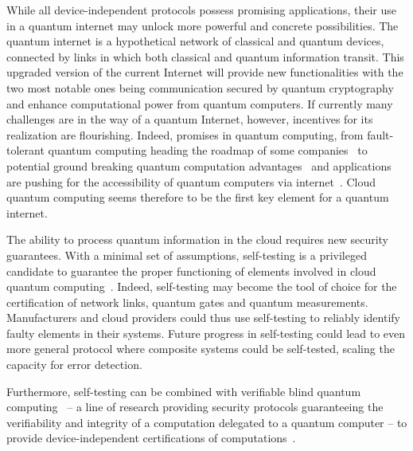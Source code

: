 While all device-independent protocols possess promising applications, their use in a quantum internet may unlock more powerful and concrete possibilities.
The quantum internet is a hypothetical network of classical and quantum devices, connected by links in which both classical and quantum information transit.
This upgraded version of the current Internet will provide new functionalities with the two most notable ones being communication secured by quantum cryptography and enhance computational power from quantum computers.
If currently many challenges are in the way of a quantum Internet, however, incentives for its realization are flourishing.
Indeed, promises in quantum computing, from fault-tolerant quantum computing heading the roadmap of some companies~\cite{Google2022,Intel2022,IBM2022} to potential ground breaking quantum computation advantages~\cite{Deutsch1992,Shor1994,Grover1996} and applications~\cite{Bauer2020,Paudel2022} are pushing for the accessibility of quantum computers via internet~\cite{Rietsche2022}.
Cloud quantum computing seems therefore to be the first key element for a quantum internet.

\medbreak

The ability to process quantum information in the cloud requires new security guarantees.
With a minimal set of assumptions, self-testing is a privileged candidate to guarantee the proper functioning of elements involved in cloud quantum computing~\cite{Sekatski2018}.
Indeed, self-testing may become the tool of choice for the certification of network links, quantum gates and quantum measurements.
Manufacturers and cloud providers could thus use self-testing to reliably identify faulty elements in their systems.
Future progress in self-testing could lead to even more general protocol where composite systems could be self-tested, scaling the capacity for error detection.

Furthermore, self-testing can be combined with verifiable blind quantum computing~\cite{Fitzsimons2017,Eisert2020} -- a line of research providing security protocols guaranteeing the verifiability and integrity of a computation delegated to a quantum computer -- to provide device-independent certifications of computations~\cite{Reichardt2013,Gheorghiu2015,Hajdusek2015,McKague2016}.

\medbreak

